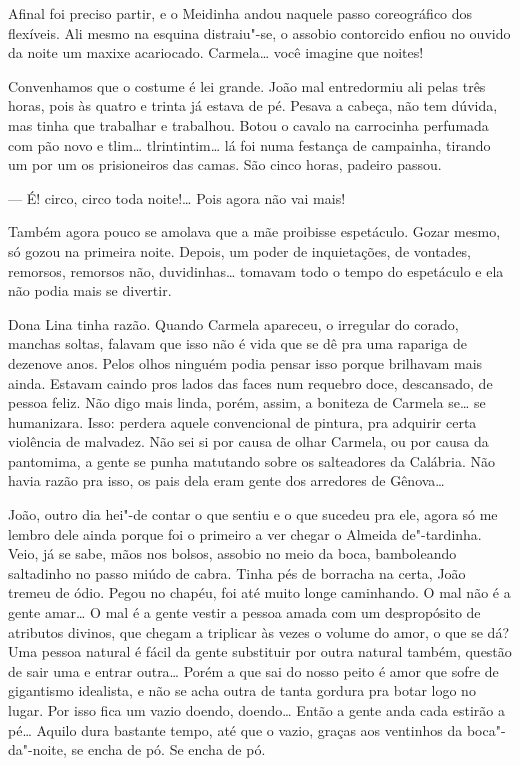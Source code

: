 Afinal foi preciso partir, e o Meidinha andou naquele passo coreográfico
dos flexíveis. Ali mesmo na esquina distraiu"-se, o assobio contorcido
enfiou no ouvido da noite um maxixe acariocado. Carmela\ldots{} você imagine
que noites!

Convenhamos que o costume é lei grande. João mal entredormiu ali pelas
três horas, pois às quatro e trinta já estava de pé. Pesava a cabeça,
não tem dúvida, mas tinha que trabalhar e trabalhou. Botou o cavalo na
carrocinha perfumada com pão novo e tlim\ldots{} tlrintintim\ldots{} lá foi numa
festança de campainha, tirando um por um os prisioneiros das camas. São
cinco horas, padeiro passou.

--- É! circo, circo toda noite!\ldots{} Pois agora não vai mais!

Também agora pouco se amolava que a mãe proibisse espetáculo. Gozar
mesmo, só gozou na primeira noite. Depois, um poder de inquietações, de
vontades, remorsos, remorsos não, duvidinhas\ldots{} tomavam todo o tempo do
espetáculo e ela não podia mais se divertir.

Dona Lina tinha razão. Quando Carmela apareceu, o irregular do corado,
manchas soltas, falavam que isso não é vida que se dê pra uma rapariga
de dezenove anos. Pelos olhos ninguém podia pensar isso porque brilhavam
mais ainda. Estavam caindo pros lados das faces num requebro doce,
descansado, de pessoa feliz. Não digo mais linda, porém, assim, a
boniteza de Carmela se\ldots{} se humanizara. Isso: perdera aquele
convencional de pintura, pra adquirir certa violência de malvadez. Não
sei si por causa de olhar Carmela, ou por causa da pantomima, a gente se
punha matutando sobre os salteadores da Calábria. Não havia razão pra
isso, os pais dela eram gente dos arredores de Gênova\ldots{}

João, outro dia hei"-de contar o que sentiu e o que sucedeu pra ele,
agora só me lembro dele ainda porque foi o primeiro a ver chegar o
Almeida de"-tardinha. Veio, já se sabe, mãos nos bolsos, assobio no meio
da boca, bamboleando saltadinho no passo miúdo de cabra. Tinha pés de
borracha na certa, João tremeu de ódio. Pegou no chapéu, foi até muito
longe caminhando. O mal não é a gente amar\ldots{} O mal é a gente vestir a
pessoa amada com um despropósito de atributos divinos, que chegam a
triplicar às vezes o volume do amor, o que se dá? Uma pessoa natural é
fácil da gente substituir por outra natural também, questão de sair uma
e entrar outra\ldots{} Porém a que sai do nosso peito é amor que sofre de
gigantismo idealista, e não se acha outra de tanta gordura pra botar
logo no lugar. Por isso fica um vazio doendo, doendo\ldots{} Então a gente
anda cada estirão a pé\ldots{} Aquilo dura bastante tempo, até que o vazio,
graças aos ventinhos da boca"-da"-noite, se encha de pó. Se encha de pó.


